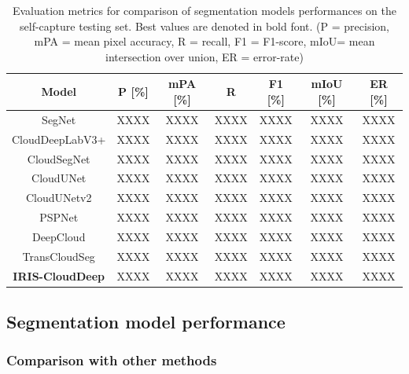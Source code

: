 \documentclass[amt, article]{copernicus}
\begin{document}
\begin{table}[t]
\begin{center}
    \caption{Evaluation metrics for comparison of segmentation models performances on the self-capture testing set. Best values are denoted in bold font. (P = precision, mPA = mean pixel accuracy, R = recall, F1 = F1-score, mIoU= mean intersection over union, ER = error-rate)}
    \begin{tabular}{c c c c c c c} 
    \tophline \hline
     Model & P [\%] & mPA [\%] & R & F1 [\%] & mIoU [\%] & ER [\%] \\ [1.0ex]
     \hline
     SegNet & XXXX & XXXX & XXXX & XXXX & XXXX & XXXX \\ [1.0ex]
     CloudDeepLabV3+ & XXXX & XXXX & XXXX & XXXX & XXXX & XXXX \\ [1.0ex]
     CloudSegNet & XXXX & XXXX & XXXX & XXXX & XXXX & XXXX \\ [1.0ex]
     CloudUNet & XXXX & XXXX & XXXX & XXXX & XXXX & XXXX \\ [1.0ex]
     CloudUNetv2 & XXXX & XXXX & XXXX & XXXX & XXXX & XXXX \\ [1.0ex]
     PSPNet & XXXX & XXXX & XXXX & XXXX & XXXX & XXXX \\ [1.0ex]
     DeepCloud & XXXX & XXXX & XXXX & XXXX & XXXX & XXXX \\ [1.0ex]
     TransCloudSeg & XXXX & XXXX & XXXX & XXXX & XXXX & XXXX \\ [1.0ex]
     \textbf{IRIS-CloudDeep} & XXXX & XXXX & XXXX & XXXX & XXXX & XXXX \\
     \hline
    \end{tabular}
    \belowtable{}
    \end{center}
\end{table}



\subsection{Segmentation model performance}

\subsubsection{Comparison with other methods}
\end{document}
